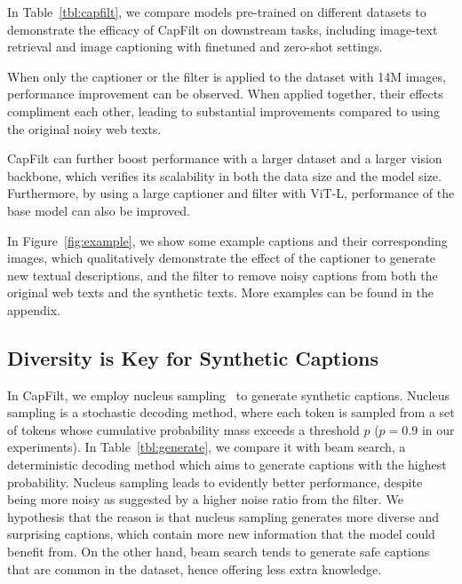 In Table~\ref{tbl:capfilt},
we compare models pre-trained on different datasets to demonstrate the efficacy of CapFilt on downstream tasks, including image-text retrieval and image captioning with finetuned and zero-shot settings.

When only the captioner or the filter is applied to the dataset with 14M images,
performance improvement can be observed.
When applied together, their effects compliment each other, leading to substantial improvements compared to using the original noisy web texts.

CapFilt can further boost performance with a larger dataset and a larger vision backbone, which verifies its scalability in both the data size and the model size.
Furthermore,
by using a large captioner and filter with ViT-L,
performance of the base model can also be improved.


In Figure~\ref{fig:example},
we show some example captions and their corresponding images,
which qualitatively demonstrate the effect of the captioner to generate new textual descriptions, and the filter to remove noisy captions from both the original web texts and the synthetic texts. 
More examples can be found in the appendix.



\vspace{-0.5ex}
\subsection{Diversity is Key for Synthetic Captions}
\vspace{-0.5ex}
In CapFilt,
we employ nucleus sampling~\cite{nucleus} to generate synthetic captions.
Nucleus sampling is a stochastic decoding method,
where each token is sampled from a set of tokens whose cumulative probability mass exceeds a threshold $p$ ($p=0.9$ in our experiments). 
In Table~\ref{tbl:generate},
we compare it with beam search, a deterministic decoding method which aims to generate captions with the highest probability.
Nucleus sampling leads to evidently better performance,
despite being more noisy as suggested by a higher noise ratio from the filter.
We hypothesis that the reason is that nucleus sampling generates more diverse and surprising captions,
which contain more new information that the model could benefit from.
On the other hand,
beam search tends to generate safe captions that are common in the dataset,
hence offering less extra knowledge.



